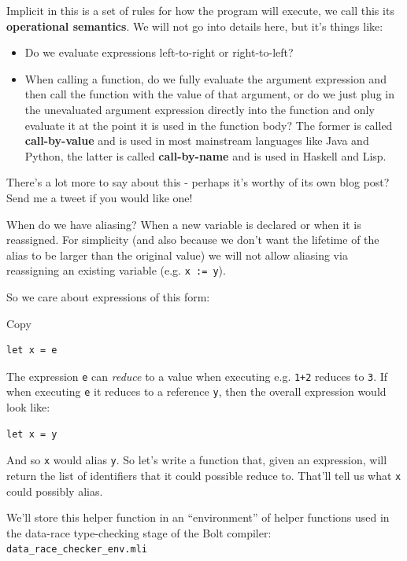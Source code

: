 Implicit in this is a set of rules for how the program will execute, we
call this its \textbf{operational semantics}. We will not go into
details here, but it's things like:

\begin{itemize}
\tightlist
\item
  Do we evaluate expressions left-to-right or right-to-left?
\item
  When calling a function, do we fully evaluate the argument expression
  and then call the function with the value of that argument, or do we
  just plug in the unevaluated argument expression directly into the
  function and only evaluate it at the point it is used in the function
  body? The former is called \textbf{call-by-value} and is used in most
  mainstream languages like Java and Python, the latter is called
  \textbf{call-by-name} and is used in Haskell and Lisp.
\end{itemize}

There's a lot more to say about this - perhaps it's worthy of its own
blog post? Send me a tweet if you would like one!

When do we have aliasing? When a new variable is declared or when it is
reassigned. For simplicity (and also because we don't want the lifetime
of the alias to be larger than the original value) we will not allow
aliasing via reassigning an existing variable (e.g. \texttt{x\ :=\ y}).

So we care about expressions of this form:

Copy

\begin{verbatim}
let x = e
\end{verbatim}

The expression \texttt{e} can \emph{reduce} to a value when executing
e.g. \texttt{1+2} reduces to \texttt{3}. If when executing \texttt{e} it reduces to a reference \texttt{y}, then
the overall expression would look like:


\begin{verbatim}
let x = y
\end{verbatim}

And so \texttt{x} would alias \texttt{y}. So let's write a function
that, given an expression, will return the list of identifiers that it
could possible reduce to. That'll tell us what \texttt{x} could possibly
alias.

We'll store this helper function in an ``environment'' of helper
functions used in the data-race type-checking stage of the Bolt
compiler: \texttt{data\_race\_checker\_env.mli}

